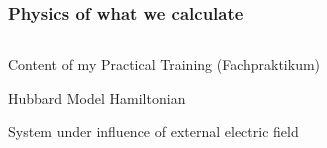 \begin{frame}
    \frametitle{Physics of what we calculate}

    \begin{columns}
            \begin{wideitemize}
                \item Content of my Practical Training (Fachpraktikum)
                \item Hubbard Model Hamiltonian
                \item System under influence of external electric field
            \end{wideitemize}


    \end{columns}
\end{frame}

